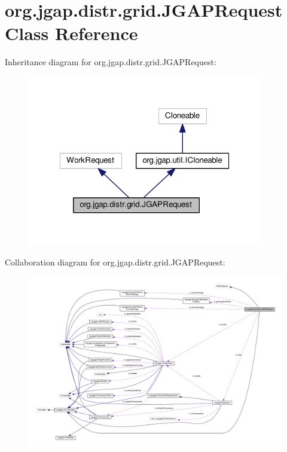 \hypertarget{classorg_1_1jgap_1_1distr_1_1grid_1_1_j_g_a_p_request}{\section{org.\-jgap.\-distr.\-grid.\-J\-G\-A\-P\-Request Class Reference}
\label{classorg_1_1jgap_1_1distr_1_1grid_1_1_j_g_a_p_request}
}


Inheritance diagram for org.\-jgap.\-distr.\-grid.\-J\-G\-A\-P\-Request\-:
\nopagebreak
\begin{figure}[H]
\begin{center}
\leavevmode
\includegraphics[width=290pt]{classorg_1_1jgap_1_1distr_1_1grid_1_1_j_g_a_p_request__inherit__graph}
\end{center}
\end{figure}


Collaboration diagram for org.\-jgap.\-distr.\-grid.\-J\-G\-A\-P\-Request\-:
\nopagebreak
\begin{figure}[H]
\begin{center}
\leavevmode
\includegraphics[width=350pt]{classorg_1_1jgap_1_1distr_1_1grid_1_1_j_g_a_p_request__coll__graph}
\end{center}
\end{figure}
